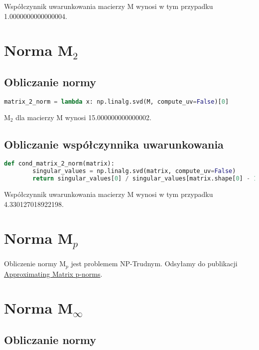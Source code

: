 \documentclass[12pt,a4paper,table]{article}
\begin{document}
    \vspace{1em}
    Współczynnik uwarunkowania macierzy M wynosi w tym przypadku 1.0000000000000004.
    
    \section{Norma M$_2$}
    
    \subsection{Obliczanie normy}

    \begin{lstlisting}[language=Python]
    matrix_2_norm = lambda x: np.linalg.svd(M, compute_uv=False)[0]
    \end{lstlisting}

    \vspace{1em}
    M$_2$ dla macierzy M wynosi 15.000000000000002.
    
    \subsection{Obliczanie współczynnika uwarunkowania}

    \begin{lstlisting}[language=Python]
    def cond_matrix_2_norm(matrix):
        singular_values = np.linalg.svd(matrix, compute_uv=False)
        return singular_values[0] / singular_values[matrix.shape[0] - 1]
    \end{lstlisting}

    \vspace{1em}
    Współczynnik uwarunkowania macierzy M wynosi w tym przypadku 4.330127018922198.
    
    \section{Norma M$_p$}
    
    Obliczenie normy M$_p$ jest problemem NP-Trudnym. Odsyłamy do publikacji \href{https://arxiv.org/pdf/1001.2613.pdf}{Approximating Matrix p-norms}.

    
    \section{Norma M$_\infty$}
    
    \subsection{Obliczanie normy}
\end{document}
